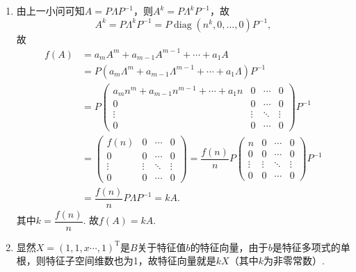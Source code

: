 \documentclass[12pt,fontset=fandol]{ctexart}
\begin{document}
\begin{solve}
\begin{enumerate}
                \item 由上一小问可知$A=P\Lambda P^{-1}$，则$A^k=P\Lambda^kP^{-1}$，故
                      \[A^k=P\Lambda^kP^{-1}=P\operatorname{diag}(n^k,0,\ldots,0)P^{-1},\]
                      故
                      \begin{align*}
                          f(A) & =a_mA^m+a_{m-1}A^{m-1}+\cdots+a_1A                                                                                                   \\
                               & =P(a_m\Lambda^m+a_{m-1}\Lambda^{m-1}+\cdots+a_1\Lambda)P^{-1}                                                               \\
                               & =P\begin{pmatrix}
                                       a_mn^m+a_{m-1}n^{m-1}+\cdots+a_1n & 0 & \cdots & 0 \\ 0 & 0 & \cdots & 0 \\ \vdots & \vdots & \ddots & \vdots \\ 0 & 0 & \cdots & 0
                                   \end{pmatrix}P^{-1} \\
                               & =\begin{pmatrix}
                                      f(n) & 0 & \cdots & 0 \\ 0 & 0 & \cdots & 0 \\ \vdots & \vdots & \ddots & \vdots \\ 0 & 0 & \cdots & 0
                                  \end{pmatrix}=\dfrac{f(n)}{n}P\begin{pmatrix}
                                                                    n & 0 & \cdots & 0 \\ 0 & 0 & \cdots & 0 \\ \vdots & \vdots & \ddots & \vdots \\ 0 & 0 & \cdots & 0
                                                                \end{pmatrix}P^{-1}    \\
                               & =\dfrac{f(n)}{n}P\Lambda P^{-1}=kA.
                      \end{align*}
                      其中$k=\dfrac{f(n)}{n}$. 故$f(A)=kA$.

                \item 显然$X=(1,1,x\cdots,1)^\mathrm{T}$是$B$关于特征值$b$的特征向量，由于$b$是特征多项式的单根，则特征子空间维数也为1，故特征向量就是$kX$（其中$k$为非零常数）.


\end{enumerate}
\end{solve}
\end{document}
